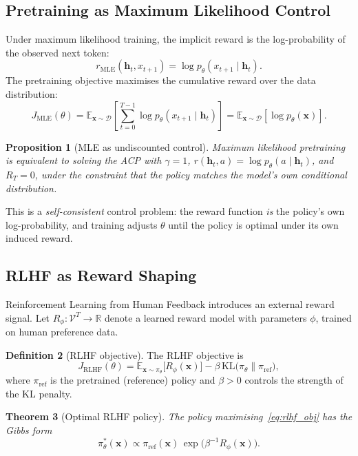 \documentclass[11pt,a4paper]{article}
\theoremstyle{plain}
\newtheorem{theorem}{Theorem}[section]
\newtheorem{proposition}[theorem]{Proposition}
\theoremstyle{definition}
\newtheorem{definition}[theorem]{Definition}
\theoremstyle{remark}
\newcommand{\R}{\mathbb{R}}
\newcommand{\E}{\mathbb{E}}
\newcommand{\cD}{\mathcal{D}}
\newcommand{\KL}{\mathrm{KL}}
\newcommand{\vocab}{\mathcal{V}}
\begin{document}
\subsection{Pretraining as Maximum Likelihood Control}

Under maximum likelihood training, the implicit reward is the log-probability of
the observed next token:
\[
  r_{\mathrm{MLE}}(\bm{h}_t, x_{t+1}) = \log p_\theta(x_{t+1} \mid \bm{h}_t).
\]
The pretraining objective maximises the cumulative reward over the data
distribution:
\[
  J_{\mathrm{MLE}}(\theta)
  = \E_{\bm{x} \sim \cD}\!\left[\sum_{t=0}^{T-1} \log p_\theta(x_{t+1} \mid \bm{h}_t)\right]
  = \E_{\bm{x} \sim \cD}[\log p_\theta(\bm{x})].
\]

\begin{proposition}[MLE as undiscounted control]
Maximum likelihood pretraining is equivalent to solving the ACP with
$\gamma = 1$, $r(\bm{h}_t, a) = \log p_\theta(a \mid \bm{h}_t)$, and $R_T = 0$,
under the constraint that the policy matches the model's own conditional
distribution.
\end{proposition}

This is a \emph{self-consistent} control problem: the reward function
\emph{is} the policy's own log-probability, and training adjusts $\theta$
until the policy is optimal under its own induced reward.

\subsection{RLHF as Reward Shaping}

Reinforcement Learning from Human Feedback introduces an external reward
signal. Let $R_\phi: \vocab^T \to \R$ denote a learned reward model with
parameters $\phi$, trained on human preference data.

\begin{definition}[RLHF objective]
The RLHF objective is
\begin{equation}\label{eq:rlhf_obj}
  J_{\mathrm{RLHF}}(\theta)
  = \E_{\bm{x} \sim \pi_\theta}\!\big[R_\phi(\bm{x})\big]
    - \beta\, \KL\!\big(\pi_\theta \| \pi_{\mathrm{ref}}\big),
\end{equation}
where $\pi_{\mathrm{ref}}$ is the pretrained (reference) policy and
$\beta > 0$ controls the strength of the KL penalty.
\end{definition}

\begin{theorem}[Optimal RLHF policy]\label{thm:rlhf_optimal}
The policy maximising~\eqref{eq:rlhf_obj} has the Gibbs form
\begin{equation}\label{eq:gibbs}
  \pi^*_\theta(\bm{x}) \propto \pi_{\mathrm{ref}}(\bm{x})\,
  \exp\!\bigl(\beta^{-1} R_\phi(\bm{x})\bigr).
\end{equation}
\end{theorem}
\end{document}
